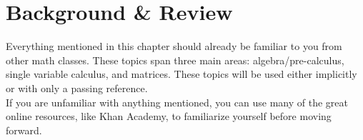 \chapter{Background \& Review}
\noindent
Everything mentioned in this chapter should already be familiar to you from other math classes. These topics span three main areas: algebra/pre-calculus, single variable calculus, and matrices. These topics will be used either implicitly or with only a passing reference.\\

\noindent
If you are unfamiliar with anything mentioned, you can use many of the great online resources, like Khan Academy, to familiarize yourself before moving forward.

